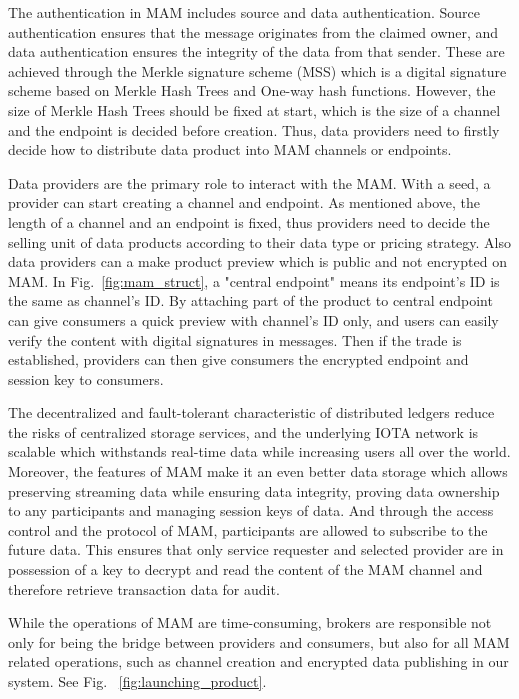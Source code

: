 \documentclass[conference]{IEEEtran}
\begin{document}
The authentication in MAM includes source and data authentication. Source authentication ensures that the message originates from the claimed owner, and data authentication ensures the integrity of the data from that sender. These are achieved through the Merkle signature scheme\cite{MSS} (MSS) which is a digital signature scheme based on Merkle Hash Trees and One-way hash functions. However, the size of Merkle Hash Trees should be fixed at start, which is the size of a channel and the endpoint is decided before creation. Thus, data providers need to firstly decide how to distribute data product into MAM channels or endpoints.

Data providers are the primary role to interact with the MAM. With a seed, a provider can start creating a channel and endpoint. As mentioned above, the length of a channel and an endpoint is fixed, thus providers need to decide the selling unit of data products according to their data type or pricing strategy. Also data providers can a make product preview which is public and not encrypted on MAM. In Fig.~\ref{fig:mam_struct}, a "central endpoint" means its endpoint's ID is the same as channel's ID. By attaching part of the product to central endpoint can give consumers a quick preview with channel's ID only, and users can easily verify the content with digital signatures in messages. Then if the trade is established, providers can then give consumers the encrypted endpoint and session key to consumers.
 
The decentralized and fault-tolerant characteristic of distributed ledgers reduce the risks of centralized storage services, and the underlying IOTA network is scalable which withstands real-time data while increasing users all over the world. Moreover, the features of MAM make it an even better data storage which allows preserving streaming data while ensuring data integrity, proving data ownership to any participants and managing session keys of data. And through the access control and the protocol of MAM, participants are allowed to subscribe to the future data. This ensures that only service requester and selected provider are in possession of a key to decrypt and read the content of the MAM channel and therefore retrieve transaction data for audit.

While the operations of MAM are time-consuming, brokers are responsible not only for being the bridge between providers and consumers, but also for all MAM related operations, such as channel creation and encrypted data publishing in our system. See Fig.~ \ref{fig:launching_product}.
\end{document}

